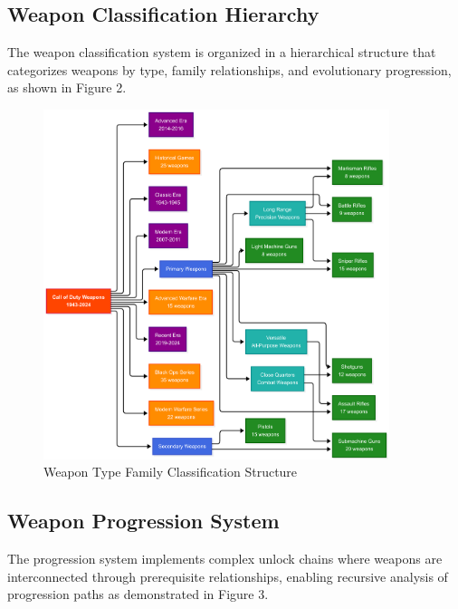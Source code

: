 \documentclass[12pt,a4paper]{article}
\begin{document}
\subsection{Weapon Classification Hierarchy}

The weapon classification system is organized in a hierarchical structure that
categorizes weapons by type, family relationships, and evolutionary
progression, as shown in Figure 2.

\begin{figure}[H]
    \centering
    \includegraphics[width=0.9\textwidth]{../diagrams/weapon-type-family-classification-vertical.png}
    \caption{Weapon Type Family Classification Structure}
\end{figure}

\subsection{Weapon Progression System}

The progression system implements complex unlock chains where weapons are
interconnected through prerequisite relationships, enabling recursive analysis
of progression paths as demonstrated in Figure 3.
\end{document}

